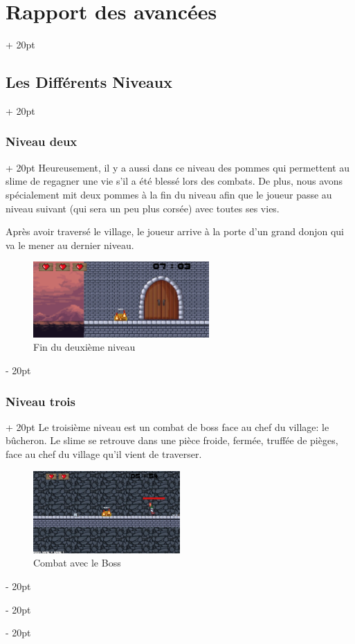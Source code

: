 \documentclass[a4paper, 12pt, twoside]{article}
\newcommand{\ind}[1][20pt]{\advance\leftskip + #1}
\newcommand{\deind}[1][20pt]{\advance\leftskip - #1}
\newenvironment{indt}[2][20pt]{#2 \par \ind[#1]}{\par \deind} %
\begin{document}
\begin{indt}{\section{Rapport des avancées}}
\begin{indt}{\subsection{Les Différents Niveaux}}
\begin{indt}{\subsubsection{Niveau deux}}
                Heureusement, il y a aussi dans ce niveau des pommes qui permettent au slime de regagner une vie s’il a été blessé lors des combats. De plus, nous avons spécialement mit deux pommes à la fin du niveau afin que le joueur passe au niveau suivant (qui sera un peu plus corsée) avec toutes ses vies.

                Après avoir traversé le village, le joueur arrive à la porte d’un grand donjon qui va le mener au dernier niveau.

                \begin{figure}[h]
                    \centering
                    \includegraphics[width=0.6\textwidth]{entree_chateau.png}
                    \caption{Fin du deuxième niveau}
                    \label{fig:mesh1}
                \end{figure}
            \end{indt}

            \newpage

            \begin{indt}{\subsubsection{Niveau trois}}
                Le troisième niveau est un combat de boss face au chef du village: le bûcheron. Le slime se retrouve dans une pièce froide, fermée, truffée de pièges, face au chef du village qu’il vient de traverser.

                \begin{figure}[h]
                    \centering
                    \includegraphics[width=0.5\textwidth]{Boss1.png}
                    \caption{Combat avec le Boss}
                    \label{fig:mesh1}
                \end{figure}


\end{indt}
\end{indt}
\end{indt}
\end{document}
